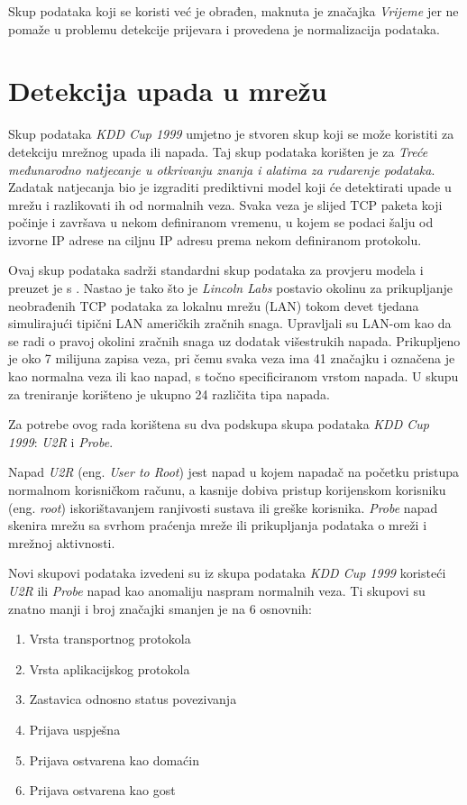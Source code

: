 \documentclass[utf8, diplomski, numeric]{fer}
\begin{document}
Skup podataka koji se koristi već je obrađen, maknuta je značajka \textit{Vrijeme} jer ne pomaže u problemu detekcije prijevara i provedena je normalizacija podataka.

\section{Detekcija upada u mrežu}
Skup podataka \textit{KDD Cup 1999} umjetno je stvoren skup koji se može koristiti za detekciju mrežnog upada ili napada. Taj skup podataka korišten je za \textit{Treće međunarodno natjecanje u otkrivanju znanja i alatima za rudarenje podataka}. Zadatak natjecanja bio je izgraditi prediktivni model koji će detektirati upade u mrežu i razlikovati ih od normalnih veza. Svaka veza je slijed TCP paketa koji počinje i završava u nekom definiranom vremenu, u kojem se podaci šalju od izvorne IP adrese na ciljnu IP adresu prema nekom definiranom protokolu.

Ovaj skup podataka sadrži standardni skup podataka za provjeru modela i preuzet je s  \cite{pang2021deep}. Nastao je tako što je \textit{Lincoln Labs} postavio okolinu za prikupljanje neobrađenih TCP podataka za lokalnu mrežu (LAN) tokom devet tjedana simulirajući tipični LAN američkih zračnih snaga. Upravljali su LAN-om kao da se radi o pravoj okolini zračnih snaga uz dodatak višestrukih napada. Prikupljeno je oko 7 milijuna zapisa veza, pri čemu svaka veza ima 41 značajku i označena je kao normalna veza ili kao napad, s točno specificiranom vrstom napada. U skupu za treniranje korišteno je ukupno 24 različita tipa napada.

Za potrebe ovog rada korištena su dva podskupa skupa podataka \textit{KDD Cup 1999}: \textit{U2R} i \textit{Probe}.

Napad \textit{U2R} (eng. \textit{User to Root}) jest napad u kojem napadač na početku pristupa normalnom korisničkom računu, a kasnije dobiva pristup korijenskom korisniku (eng. \textit{root}) iskorištavanjem ranjivosti sustava ili greške korisnika. \textit{Probe} napad skenira mrežu sa svrhom praćenja mreže ili prikupljanja podataka o mreži i mrežnoj aktivnosti.

Novi skupovi podataka izvedeni su iz skupa podataka \textit{KDD Cup 1999} koristeći \textit{U2R} ili \textit{Probe} napad kao anomaliju naspram normalnih veza. Ti skupovi su znatno manji i broj značajki smanjen je na 6 osnovnih: 
\begin{enumerate}
\item Vrsta transportnog protokola
\item Vrsta aplikacijskog protokola
\item Zastavica odnosno status povezivanja
\item Prijava uspješna
\item Prijava ostvarena kao domaćin
\item Prijava ostvarena kao gost
\end{enumerate}
\end{document}
